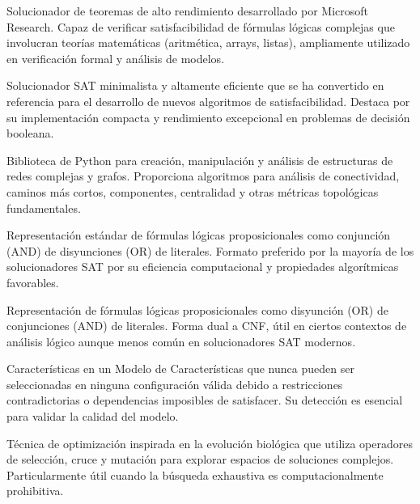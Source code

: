 \begin{description}[style=nextline,leftmargin=0pt]
    \item[Z3 Solver]
    Solucionador de teoremas de alto rendimiento desarrollado por Microsoft Research. Capaz de verificar satisfacibilidad de fórmulas lógicas complejas que involucran teorías matemáticas (aritmética, arrays, listas), ampliamente utilizado en verificación formal y análisis de modelos.
    
    \item[MiniSAT]
    Solucionador SAT minimalista y altamente eficiente que se ha convertido en referencia para el desarrollo de nuevos algoritmos de satisfacibilidad. Destaca por su implementación compacta y rendimiento excepcional en problemas de decisión booleana.
    
    \item[NetworkX]
    Biblioteca de Python para creación, manipulación y análisis de estructuras de redes complejas y grafos. Proporciona algoritmos para análisis de conectividad, caminos más cortos, componentes, centralidad y otras métricas topológicas fundamentales.
    
    \item[Forma Normal Conjuntiva (CNF)]
    Representación estándar de fórmulas lógicas proposicionales como conjunción (AND) de disyunciones (OR) de literales. Formato preferido por la mayoría de los solucionadores SAT por su eficiencia computacional y propiedades algorítmicas favorables.
    
    \item[Forma Normal Disyuntiva (DNF)]
    Representación de fórmulas lógicas proposicionales como disyunción (OR) de conjunciones (AND) de literales. Forma dual a CNF, útil en ciertos contextos de análisis lógico aunque menos común en solucionadores SAT modernos.
    
    \item[Características Muertas (\textit{Dead Features})]
    Características en un Modelo de Características que nunca pueden ser seleccionadas en ninguna configuración válida debido a restricciones contradictorias o dependencias imposibles de satisfacer. Su detección es esencial para validar la calidad del modelo.
    
    \item[Algoritmos Genéticos]
    Técnica de optimización inspirada en la evolución biológica que utiliza operadores de selección, cruce y mutación para explorar espacios de soluciones complejos. Particularmente útil cuando la búsqueda exhaustiva es computacionalmente prohibitiva.
    

\end{description}
